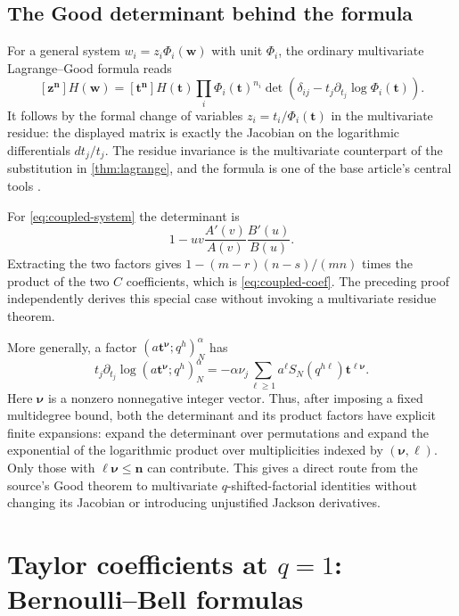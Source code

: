 \documentclass[11pt,a4paper]{article}
\numberwithin{equation}{section}
\theoremstyle{definition}
\theoremstyle{remark}
\newcommand{\poch}[3]{(#1;#2)_{#3}}
\begin{document}
\subsection{The Good determinant behind the formula}
For a general system $w_i=z_i\Phi_i(\bm w)$ with unit $\Phi_i$, the ordinary
multivariate Lagrange--Good formula reads
\begin{equation}\label{eq:Good}
 [\bm z^{\bm n}]H(\bm w)
 =[\bm t^{\bm n}]H(\bm t)\prod_i\Phi_i(\bm t)^{n_i}
   \det\left(\delta_{ij}-t_j\partial_{t_j}\log\Phi_i(\bm t)\right).
\end{equation}
It follows by the formal change of variables $z_i=t_i/\Phi_i(\bm t)$ in the
multivariate residue: the displayed matrix is exactly the Jacobian on the
logarithmic differentials $dt_j/t_j$. The residue invariance is the
multivariate counterpart of the substitution in \cref{thm:lagrange}, and the
formula is one of the base article's central tools \cite{CCC}.

For \eqref{eq:coupled-system} the determinant is
\[
 1-uv\frac{A'(v)}{A(v)}\frac{B'(u)}{B(u)}.
\]
Extracting the two factors gives
$1-(m-r)(n-s)/(mn)$ times the product of the two $C$ coefficients, which is
\eqref{eq:coupled-coef}. The preceding proof independently derives this special
case without invoking a multivariate residue theorem.

More generally, a factor
$\poch{a\bm t^{\bm\nu}}{q^h}N^\alpha$ has
\begin{equation}\label{eq:Good-entry}
 t_j\partial_{t_j}\log\poch{a\bm t^{\bm\nu}}{q^h}N^\alpha
  =-\alpha\nu_j\sum_{\ell\ge1}
       a^\ell S_N(q^{h\ell})\bm t^{\ell\bm\nu}.
\end{equation}
Here $\bm\nu$ is a nonzero nonnegative integer vector. Thus, after imposing a
fixed multidegree bound, both the determinant and its product factors have
explicit finite expansions: expand the determinant over permutations and expand
the exponential of the logarithmic product over multiplicities indexed by
$(\bm\nu,\ell)$. Only those with $\ell\bm\nu\le\bm n$ can contribute.
This gives a direct route from the source's Good theorem to multivariate
$q$-shifted-factorial identities without changing its Jacobian or introducing
unjustified Jackson derivatives.

\section{Taylor coefficients at \texorpdfstring{$q=1$}{q=1}: Bernoulli--Bell formulas}
\label{sec:one-jets}
\end{document}
